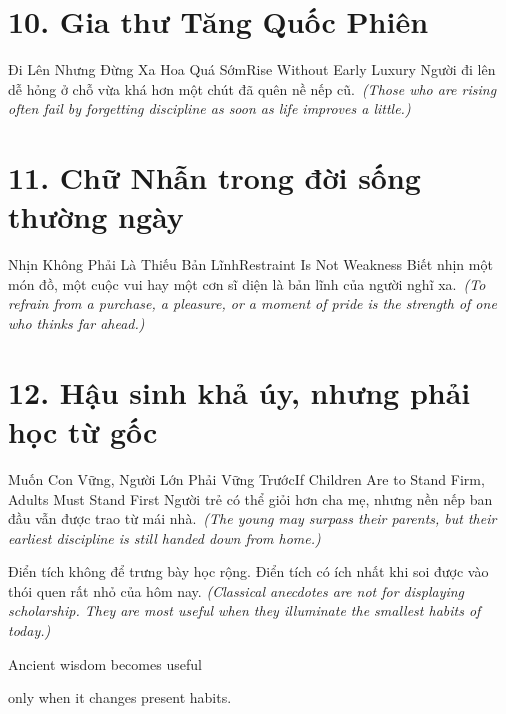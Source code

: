 \section*{10. Gia thư Tăng Quốc Phiên}
\begin{truyen}{Đi Lên Nhưng Đừng Xa Hoa Quá Sớm}{Rise Without Early Luxury}
Người đi lên dễ hỏng ở chỗ vừa khá hơn một chút đã quên nề nếp cũ.\
\textit{(Those who are rising often fail by forgetting discipline as soon as life improves a little.)}
\end{truyen}

\section*{11. Chữ Nhẫn trong đời sống thường ngày}
\begin{truyen}{Nhịn Không Phải Là Thiếu Bản Lĩnh}{Restraint Is Not Weakness}
Biết nhịn một món đồ, một cuộc vui hay một cơn sĩ diện là bản lĩnh của người nghĩ xa.\
\textit{(To refrain from a purchase, a pleasure, or a moment of pride is the strength of one who thinks far ahead.)}
\end{truyen}

\section*{12. Hậu sinh khả úy, nhưng phải học từ gốc}
\begin{truyen}{Muốn Con Vững, Người Lớn Phải Vững Trước}{If Children Are to Stand Firm, Adults Must Stand First}
Người trẻ có thể giỏi hơn cha mẹ, nhưng nền nếp ban đầu vẫn được trao từ mái nhà.\
\textit{(The young may surpass their parents, but their earliest discipline is still handed down from home.)}
\end{truyen}

\begin{baihoc}
Điển tích không để trưng bày học rộng. Điển tích có ích nhất khi soi được vào thói quen rất nhỏ của hôm nay.
\textit{(Classical anecdotes are not for displaying scholarship. They are most useful when they illuminate the smallest habits of today.)}
\end{baihoc}

\begin{ghinhoanh}
Ancient wisdom becomes useful

only when it changes present habits.
\end{ghinhoanh}

\ngancach